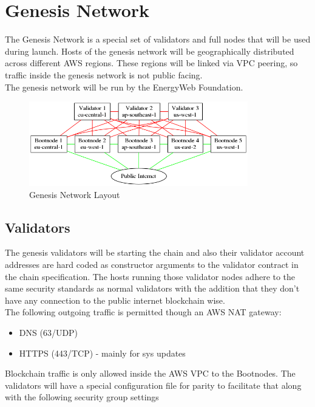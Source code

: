 \section{Genesis Network}

The Genesis Network is a special set of validators and full nodes that will be used during launch. Hosts of the genesis network will be geographically distributed across different AWS regions. These regions will be linked via VPC peering, so traffic inside the genesis network is not public facing. \\

The genesis network will be run by the EnergyWeb Foundation.

\begin{figure}[ht]
	\centering
    \includegraphics[width=0.85\textwidth,keepaspectratio]{./images/genesis-network.png}
	\caption{Genesis Network Layout}
	\label{fig:genesisnet}
\end{figure}

\subsection{Validators}

The genesis validators will be starting the chain and also their validator account addresses are hard coded as constructor arguments to the validator contract in the chain specification. The hosts running those validator nodes adhere to the same security standards as normal validators with the addition that they don't have any connection to the public internet blockchain wise. \\
The following outgoing traffic is permitted though an AWS NAT gateway:

\begin{itemize}
    \item DNS (63/UDP)
    \item HTTPS (443/TCP) - mainly for sys updates
\end{itemize}

Blockchain traffic is only allowed inside the AWS VPC to the Bootnodes. The validators will have a special configuration file for parity to facilitate that along with the following security group settings

